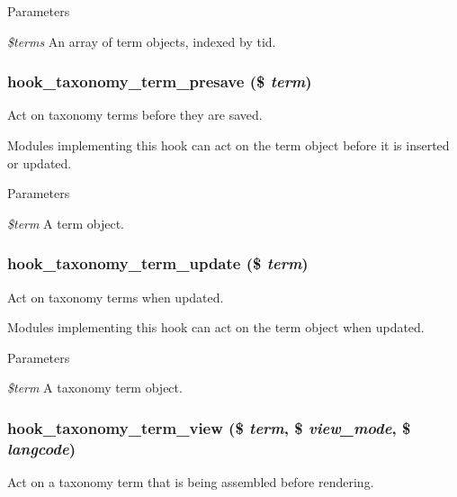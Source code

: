 \begin{DoxyParams}{Parameters}
\item[{\em \$terms}]An array of term objects, indexed by tid. \end{DoxyParams}
\hypertarget{group__hooks_ga2dad7857b3613834314f694e183e1fdb}{
\subsubsection[{hook\_\-taxonomy\_\-term\_\-presave}]{\setlength{\rightskip}{0pt plus 5cm}hook\_\-taxonomy\_\-term\_\-presave (\$ {\em term})}}
\label{group__hooks_ga2dad7857b3613834314f694e183e1fdb}
Act on taxonomy terms before they are saved.

Modules implementing this hook can act on the term object before it is inserted or updated.


\begin{DoxyParams}{Parameters}
\item[{\em \$term}]A term object. \end{DoxyParams}
\hypertarget{group__hooks_ga5c2477516245f0b9d6b04b8a8d227592}{
\subsubsection[{hook\_\-taxonomy\_\-term\_\-update}]{\setlength{\rightskip}{0pt plus 5cm}hook\_\-taxonomy\_\-term\_\-update (\$ {\em term})}}
\label{group__hooks_ga5c2477516245f0b9d6b04b8a8d227592}
Act on taxonomy terms when updated.

Modules implementing this hook can act on the term object when updated.


\begin{DoxyParams}{Parameters}
\item[{\em \$term}]A taxonomy term object. \end{DoxyParams}
\hypertarget{group__hooks_gaeb73cbcc621835fb8f1d9114b3234bd5}{
\subsubsection[{hook\_\-taxonomy\_\-term\_\-view}]{\setlength{\rightskip}{0pt plus 5cm}hook\_\-taxonomy\_\-term\_\-view (\$ {\em term}, \/  \$ {\em view\_\-mode}, \/  \$ {\em langcode})}}
\label{group__hooks_gaeb73cbcc621835fb8f1d9114b3234bd5}
Act on a taxonomy term that is being assembled before rendering.

